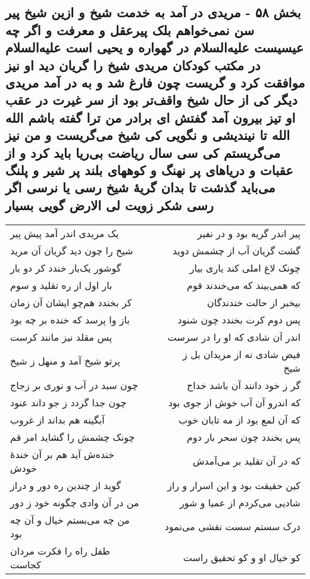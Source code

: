 \begin{center}
\section*{بخش ۵۸ - مریدی در آمد به خدمت شیخ و ازین شیخ پیر سن نمی‌خواهم بلک پیرعقل و معرفت و اگر چه عیسیست علیه‌السلام در گهواره و یحیی است علیه‌السلام در مکتب کودکان مریدی شیخ را گریان دید او نیز موافقت کرد و گریست چون فارغ شد و به در آمد مریدی دیگر کی از حال شیخ واقف‌تر بود از سر غیرت در عقب او تیز بیرون آمد گفتش ای برادر من ترا گفته باشم الله الله تا نیندیشی و نگویی کی شیخ می‌گریست و من نیز می‌گریستم کی سی سال ریاضت بی‌ریا باید کرد و از عقبات و دریاهای پر نهنگ و کوههای بلند پر شیر و پلنگ می‌باید گذشت تا بدان گریهٔ شیخ رسی یا نرسی اگر رسی شکر زویت لی الارض گویی بسیار}
\label{sec:sh058}
\begin{longtable}{l p{0.5cm} r}
یک مریدی اندر آمد پیش پیر
&&
پیر اندر گریه بود و در نفیر
\\
شیخ را چون دید گریان آن مرید
&&
گشت گریان آب از چشمش دوید
\\
گوشور یک‌بار خندد کر دو بار
&&
چونک لاغ املی کند یاری بیار
\\
بار اول از ره تقلید و سوم
&&
که همی‌بیند که می‌خندند قوم
\\
کر بخندد هم‌چو ایشان آن زمان
&&
بیخبر از حالت خندندگان
\\
باز وا پرسد که خنده بر چه بود
&&
پس دوم کرت بخندد چون شنود
\\
پس مقلد نیز مانند کرست
&&
اندر آن شادی که او را در سرست
\\
پرتو شیخ آمد و منهل ز شیخ
&&
فیض شادی نه از مریدان بل ز شیخ
\\
چون سبد در آب و نوری بر زجاج
&&
گر ز خود دانند آن باشد خداج
\\
چون جدا گردد ز جو داند عنود
&&
که اندرو آن آب خوش از جوی بود
\\
آبگینه هم بداند از غروب
&&
که آن لمع بود از مه تابان خوب
\\
چونک چشمش را گشاید امر قم
&&
پس بخندد چون سحر بار دوم
\\
خنده‌ش آید هم بر آن خندهٔ خودش
&&
که در آن تقلید بر می‌آمدش
\\
گوید از چندین ره دور و دراز
&&
کین حقیقت بود و این اسرار و راز
\\
من در آن وادی چگونه خود ز دور
&&
شادیی می‌کردم از عمیا و شور
\\
من چه می‌بستم خیال و آن چه بود
&&
درک سستم سست نقشی می‌نمود
\\
طفل راه را فکرت مردان کجاست
&&
کو خیال او و کو تحقیق راست

\end{longtable}
\end{center}
